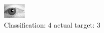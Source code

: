\begin{figure}[h!]
\begin{center}
\includegraphics[width=0.60\columnwidth]{figures/ID2795_class_4_target_3.png}
\end{center}
\caption{ Classification: 4 actual target: 3}
\label{fig:ID2795_class_4_target_3}
\end{figure}
